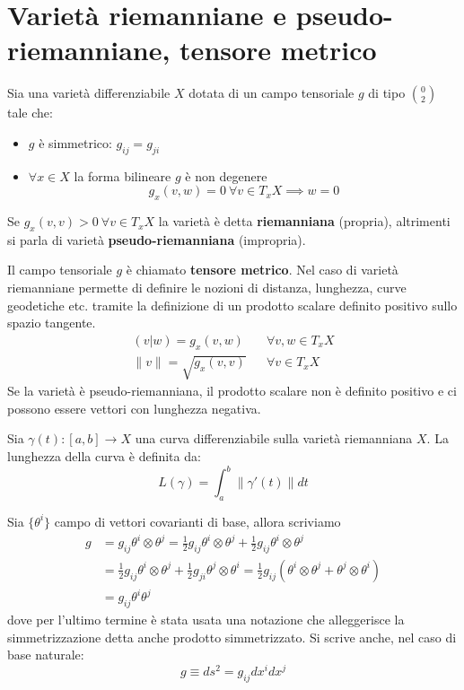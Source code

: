 \section{Varietà riemanniane e pseudo-riemanniane, tensore metrico}
\begin{definizione}
Sia una varietà differenziabile $X$ dotata di un campo tensoriale $g$ di tipo $\binom{0}{2}$ tale che:
\begin{itemize}
    \item $g$ è simmetrico: $g_{ij} = g_{ji}$
    \item $\forall x \in X$ la forma bilineare $g$ è non degenere
    \begin{equation*}
        g_x(v, w) = 0 \ \forall v \in T_xX \implies w= 0
    \end{equation*}
\end{itemize}
Se $g_x(v,v) > 0 \ \forall v \in T_xX$ la varietà è detta \textbf{riemanniana} (propria), altrimenti si parla di varietà \textbf{pseudo-riemanniana} (impropria).
\end{definizione}
Il campo tensoriale $g$ è chiamato \textbf{tensore metrico}. Nel caso di varietà riemanniane permette di definire le nozioni di distanza, lunghezza, curve geodetiche etc. tramite la definizione di un prodotto scalare definito positivo sullo spazio tangente.
\begin{align*}
    (v | w) = g_x(v,w) &&  \forall v, w  \in T_xX\\
    \| v \| = \sqrt{g_x(v,v)} &&  \forall v \in T_xX
\end{align*}
Se la varietà è pseudo-riemanniana, il prodotto scalare non è definito positivo e ci possono essere vettori con lunghezza negativa.
\begin{esempio}
Sia $\gamma(t) : [a,b] \rightarrow X$ una curva differenziabile sulla varietà riemanniana $X$.
La lunghezza della curva è definita da:
\begin{equation*}
    L(\gamma) = \int_a^b\|\gamma ' (t) \|dt
\end{equation*}
\end{esempio}

Sia $\{\theta^i\}$ campo di vettori covarianti di base, allora scriviamo
\begin{align*}
    g &= g_{ij} \theta^i \otimes \theta^j = \frac{1}{2} g_{ij} \theta^i \otimes \theta^j + \frac{1}{2} g_{ij} \theta^i \otimes \theta^j\\
    &= \frac{1}{2} g_{ij} \theta^i \otimes \theta^j + \frac{1}{2} g_{ji} \theta^j \otimes \theta^i = \frac{1}{2} g_{ij}( \theta^i \otimes \theta^j + \theta^j \otimes \theta^i) \\
    &= g_{ij} \theta^i \theta^j
\end{align*}
dove per l'ultimo termine è stata usata una notazione che alleggerisce la simmetrizzazione detta anche prodotto simmetrizzato. Si scrive anche, nel caso di base naturale:
\begin{equation*}
    g \equiv ds^2 = g_{ij}dx^idx^j
\end{equation*}

